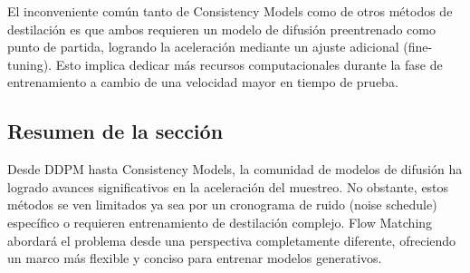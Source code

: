 El inconveniente común tanto de Consistency Models como de otros métodos de destilación es que ambos requieren un modelo de difusión preentrenado como punto de partida, logrando la aceleración mediante un ajuste adicional (fine-tuning). Esto implica dedicar más recursos computacionales durante la fase de entrenamiento a cambio de una velocidad mayor en tiempo de prueba.

\subsection{Resumen de la sección}

Desde DDPM hasta Consistency Models, la comunidad de modelos de difusión ha logrado avances significativos en la aceleración del muestreo. No obstante, estos métodos se ven limitados ya sea por un cronograma de ruido (noise schedule) específico o requieren entrenamiento de destilación complejo. Flow Matching abordará el problema desde una perspectiva completamente diferente, ofreciendo un marco más flexible y conciso para entrenar modelos generativos.

